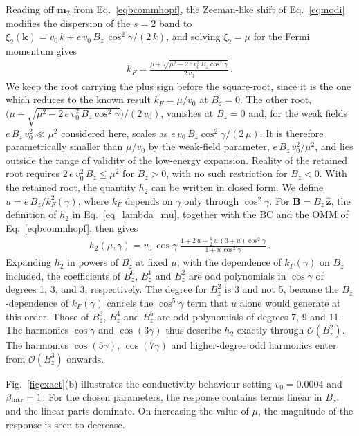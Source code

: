 \documentclass[aps,prb,onecolumn,nofootinbib,citeautoscript,10pt]{revtex4-2}
\newcommand{\bs}[1]{\boldsymbol{#1}}
\begin{document}
Reading off $\bs m_2$ from Eq.~\eqref{eqbcommhopf}, the Zeeman-like shift of Eq.~\eqref{eqmodi} modifies the dispersion of the $s=2$ band to
$\xi_2 (\boldsymbol k) = v_0 \, k + e \, v_0 \, B_z \, \cos^2 \gamma /(2\, k)$, and solving $\xi_2 = \mu $ for the Fermi momentum gives
\begin{align}
k_F =  \frac{ \mu + \sqrt{\mu^2- 2\, e\, v_0^2\, B_z \cos^2 \gamma } } {2\, v_0}\,.
\end{align}
We keep the root carrying the plus sign before the square-root, since it is the one which reduces to the known result $k_F = \mu /v_0 $ at $B_z=0$. The other root, ${ \big ( \mu - \sqrt{\mu^2- 2\, e\, v_0^2\, B_z \cos^2 \gamma } \big ) } /(2\, v_0)$, vanishes at $B_z=0$ and, for the weak fields $e \,B_z\, v_0^2 \ll \mu^2$ considered here, scales as $e \,v_0\, B_z \cos^2\gamma/(2 \,\mu)$. It is therefore parametrically smaller than $\mu/v_0$ by the weak-field parameter, $e \,B_z\, v_0^2/\mu^2$, and lies outside the range of validity of the low-energy expansion. Reality of the retained root requires $2\, e\, v_0^2\, B_z \le \mu^2$ for $B_z>0$, with no such restriction for $B_z<0$. With the retained root, the quantity $h_2$ can be written in closed form. We define $u=e\,B_z/k_F^2(\gamma)$, where $k_F$ depends on $\gamma$ only through $\cos^2\gamma$. For $\bs B=B_z\,\hat{\bs z}$, the definition of $h_2$ in Eq.~\eqref{eq_lambda_mu}, together with the BC and the OMM of Eq.~\eqref{eqbcommhopf}, then gives
\begin{align}
\label{eqh-hopf}
h_2(\mu,\gamma)=v_0\,\cos\gamma\;\frac{1+2\,u-\frac{1}{2}\,u\,(3+u)\cos^2\gamma}{1+u\,\cos^2\gamma}\,.
\end{align}
Expanding $h_2$ in powers of $B_z$ at fixed $\mu$, with the dependence of $k_F(\gamma)$ on $B_z$ included, the coefficients of $B_z^0$, $B_z^1$ and $B_z^2$ are odd polynomials in $\cos\gamma$ of degrees 1, 3, and 3, respectively. The degree for $B_z^2$ is 3 and not 5, because the $B_z$-dependence of $k_F(\gamma)$ cancels the $\cos^5\gamma$ term that $u$ alone would generate at this order. Those of $B_z^3$, $B_z^4$ and $B_z^5$ are odd polynomials of degrees 7, 9 and 11. The harmonics $\cos\gamma$ and $\cos (3\gamma)$ thus describe $h_2$ exactly through $\mathcal O(B_z^2)$. The harmonics $\cos (5 \gamma)$, $\cos (7 \gamma)$ and higher-degree odd harmonics enter from $\mathcal O(B_z^3)$ onwards.

Fig.~\ref{figexact}(b) illustrates the conductivity behaviour setting $v_0 = 0.0004$ and $\beta_{\rm intr}=1 $. For the chosen parameters, the response contains terms linear in $B_z$, and the linear parts dominate. On increasing the value of $\mu$, the magnitude of the response is seen to decrease. 
\end{document}

